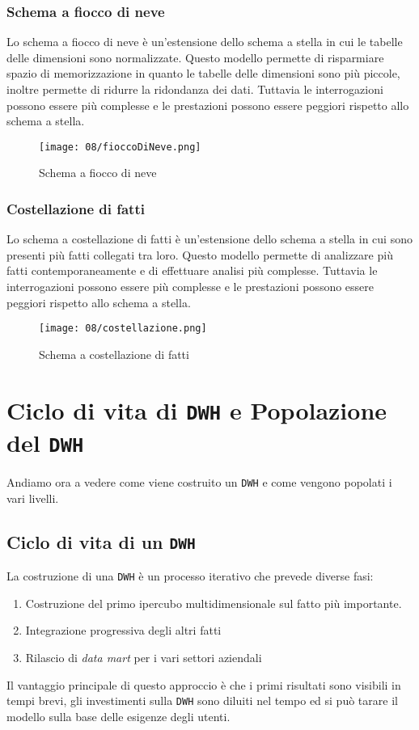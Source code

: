         \subsubsection{Schema a fiocco di neve} 
            Lo schema a fiocco di neve è un'estensione dello schema a stella in cui le tabelle delle dimensioni sono normalizzate. Questo modello permette di risparmiare spazio di memorizzazione in quanto le tabelle delle dimensioni sono più piccole, inoltre permette di ridurre la ridondanza dei dati. Tuttavia le interrogazioni possono essere più complesse e le prestazioni possono essere peggiori rispetto allo schema a stella.
            \begin{figure}[H]
                \centering
                \texttt{[image: 08/fioccoDiNeve.png]}
                \caption{Schema a fiocco di neve}
            \end{figure}
        \subsubsection{Costellazione di fatti}
            Lo schema a costellazione di fatti è un'estensione dello schema a stella in cui sono presenti più fatti collegati tra loro. Questo modello permette di analizzare più fatti contemporaneamente e di effettuare analisi più complesse. Tuttavia le interrogazioni possono essere più complesse e le prestazioni possono essere peggiori rispetto allo schema a stella.
            \begin{figure}[H]
                \centering
                \texttt{[image: 08/costellazione.png]}
                \caption{Schema a costellazione di fatti}
            \end{figure}
\section{Ciclo di vita di \texttt{DWH} e Popolazione del \texttt{DWH}}
    Andiamo ora a vedere come viene costruito un \texttt{DWH} e come vengono popolati i vari livelli.
    \subsection{Ciclo di vita di un \texttt{DWH}}
        La costruzione di una \texttt{DWH} è un processo iterativo che prevede diverse fasi:
        \begin{enumerate}
            \item Costruzione del primo ipercubo multidimensionale sul fatto più importante.
            \item Integrazione progressiva degli altri fatti
            \item Rilascio di \textit{data mart} per i vari settori aziendali
        \end{enumerate}
        Il vantaggio principale di questo approccio è che i primi risultati sono visibili in tempi brevi, gli investimenti sulla \texttt{DWH} sono diluiti nel tempo ed si può tarare il modello sulla base delle esigenze degli utenti.
